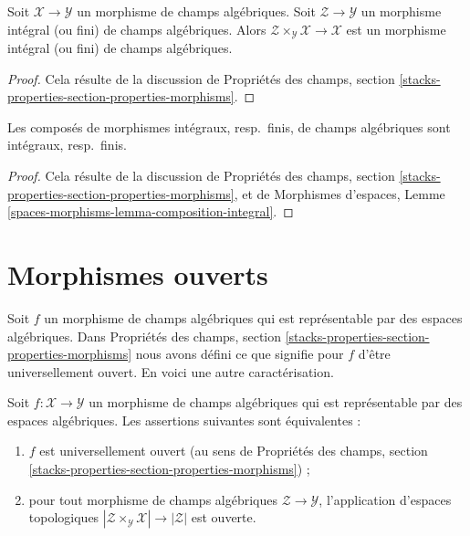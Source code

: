 \begin{lemma}
\label{lemma-base-change-integral}
Soit $\mathcal{X} \to \mathcal{Y}$ un morphisme de champs algébriques.
Soit $\mathcal{Z} \to \mathcal{Y}$ un morphisme intégral (ou fini) de champs
algébriques. Alors
$\mathcal{Z} \times_\mathcal{Y} \mathcal{X} \to \mathcal{X}$
est un morphisme intégral (ou fini) de champs algébriques.
\end{lemma}

\begin{proof}
Cela résulte de la discussion de Propriétés des champs, section
\ref{stacks-properties-section-properties-morphisms}.
\end{proof}

\begin{lemma}
\label{lemma-composition-integral}
Les composés de morphismes intégraux, resp.\ finis, de champs algébriques sont
intégraux, resp.\ finis.
\end{lemma}

\begin{proof}
Cela résulte de la discussion de Propriétés des champs, section
\ref{stacks-properties-section-properties-morphisms}, et de Morphismes
d'espaces, Lemme \ref{spaces-morphisms-lemma-composition-integral}.
\end{proof}




\section{Morphismes ouverts}
\label{section-open}

\noindent
Soit $f$ un morphisme de champs algébriques qui est représentable par
des espaces algébriques. Dans Propriétés des champs, section
\ref{stacks-properties-section-properties-morphisms}
nous avons défini ce que signifie pour $f$ d'être universellement ouvert.
En voici une autre caractérisation.

\begin{lemma}
\label{lemma-characterize-representable-universally-open}
Soit $f : \mathcal{X} \to \mathcal{Y}$ un morphisme de
champs algébriques qui est représentable par des espaces algébriques.
Les assertions suivantes sont équivalentes :
\begin{enumerate}
\item $f$ est universellement ouvert (au sens de Propriétés des champs,
section \ref{stacks-properties-section-properties-morphisms}) ;
\item pour tout morphisme de champs algébriques
$\mathcal{Z} \to \mathcal{Y}$, l'application d'espaces topologiques
$|\mathcal{Z} \times_\mathcal{Y} \mathcal{X}| \to |\mathcal{Z}|$ est ouverte.
\end{enumerate}
\end{lemma}


